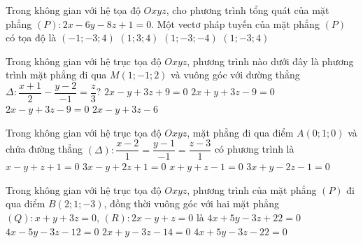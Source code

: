 \begin{ex}%
	Trong không gian với hệ tọa độ $Oxyz$, cho phương trình tổng quát của mặt phẳng $(P)\colon 2x-6y-8z+1=0$. Một vectơ pháp tuyến của mặt phẳng $(P)$ có tọa độ là
	\choice
	{$(-1;-3;4)$}
	{$(1;3;4)$}
	{\True $(1;-3;-4)$}
	{$(1;-3;4)$}
\end{ex}
\begin{ex}%
	Trong không gian với hệ trục tọa độ $Oxyz$, phương trình nào dưới đây là phương trình mặt phẳng đi qua $M(1;-1;2)$ và vuông góc với đường thẳng $\Delta\colon\dfrac{x+1}{2}-\dfrac{y-2}{-1}=\dfrac{z}{3}$?
	\choice
	{$2x-y+3z+9=0$}
	{$2x+y+3z-9=0$}
	{\True $2x-y+3z-9=0$}
	{$2x-y+3z-6$}
\end{ex}

\begin{ex}%
	Trong không gian với hệ trục tọa độ $Oxyz$, mặt phẳng đi qua điểm $A(0;1;0)$ và chứa đường thẳng $(\Delta)\colon\dfrac{x-2}{1}=\dfrac{y-1}{-1}=\dfrac{z-3}{1}$ có phương trình là
	\choice
	{$x-y+z+1=0$}
	{$3x-y+2z+1=0$}
	{$x+y+z-1=0$}
	{\True $3x+y-2z-1=0$}
\end{ex}

\begin{ex}%
	Trong không gian với hệ trục tọa độ $Oxyz$, phương trình của mặt phẳng $(P)$ đi qua điểm $B(2;1;-3)$, đồng thời vuông góc với hai mặt phẳng $(Q)\colon x+y+3z=0$, $(R)\colon 2x-y+z=0$ là
	\choice
	{$4x+5y-3z+22=0$}
	{$4x-5y-3z-12=0$}
	{$2x+y-3z-14=0$}
	{\True $4x+5y-3z-22=0$}
\end{ex}

